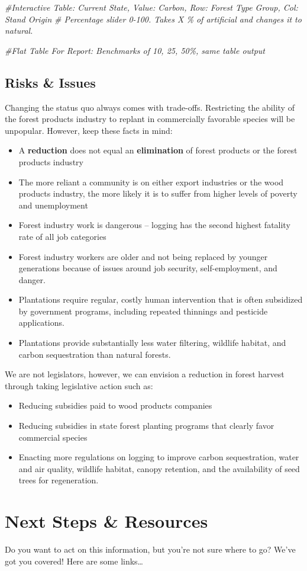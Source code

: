 \documentclass[
]{article}
\newenvironment{Shaded}{\begin{snugshade}}{\end{snugshade}}
\newcommand{\CommentTok}[1]{\textcolor[rgb]{0.56,0.35,0.01}{\textit{#1}}}
\begin{document}
\begin{Shaded}
\begin{Highlighting}[]
\CommentTok{\#Interactive Table: Current State, Value: Carbon, Row: Forest Type Group, Col: Stand Origin}
\CommentTok{\#   Percentage slider 0{-}100. Takes X \% of artificial and changes it to natural.}

\CommentTok{\#Flat Table For Report: Benchmarks of 10, 25, 50\%, same table output}
\end{Highlighting}
\end{Shaded}

\hypertarget{risks-issues}{%
\subsection{Risks \& Issues}\label{risks-issues}}

Changing the status quo always comes with trade-offs. Restricting the
ability of the forest products industry to replant in commercially
favorable species will be unpopular. However, keep these facts in mind:

\begin{itemize}
\item
  A \textbf{reduction} does not equal an \textbf{elimination} of forest
  products or the forest products industry
\item
  The more reliant a community is on either export industries or the
  wood products industry, the more likely it is to suffer from higher
  levels of poverty and unemployment
\item
  Forest industry work is dangerous -- logging has the second highest
  fatality rate of all job categories
\item
  Forest industry workers are older and not being replaced by younger
  generations because of issues around job security, self-employment,
  and danger.
\item
  Plantations require regular, costly human intervention that is often
  subsidized by government programs, including repeated thinnings and
  pesticide applications.
\item
  Plantations provide substantially less water filtering, wildlife
  habitat, and carbon sequestration than natural forests.
\end{itemize}

We are not legislators, however, we can envision a reduction in forest
harvest through taking legislative action such as:

\begin{itemize}
\item
  Reducing subsidies paid to wood products companies
\item
  Reducing subsidies in state forest planting programs that clearly
  favor commercial species
\item
  Enacting more regulations on logging to improve carbon sequestration,
  water and air quality, wildlife habitat, canopy retention, and the
  availability of seed trees for regeneration.
\end{itemize}

\hypertarget{next-steps-resources}{%
\section{Next Steps \& Resources}\label{next-steps-resources}}

Do you want to act on this information, but you're not sure where to go?
We've got you covered! Here are some links\ldots{}
\end{document}
